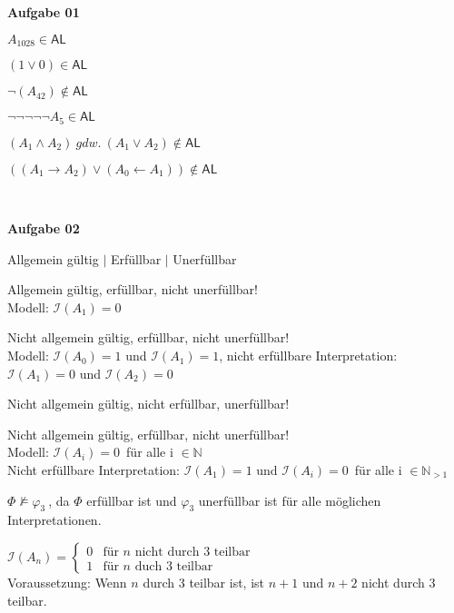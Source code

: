 \documentclass[a4paper,10pt]{article}
\begin{document}
	\parindent0pt
	\textbf{Aufgabe 01}
	\begin{compactenum}[(i)]
		\item $ A_{1028} \in \mathsf{AL} $
		\item $ (1 \vee 0) \in \mathsf{AL}$
		\item $ \lnot(A_{42})\notin \mathsf{AL}$
		\item $ \lnot\lnot\lnot\lnot\lnot A_5 \in \mathsf{AL}$
		\item $ (A_1 \wedge A_2)\ gdw.\ (A_1 \vee A_2)\notin \mathsf{AL}$
		\item $ ((A_1 \to A_2) \vee (A_0 \leftarrow A_1))\notin \mathsf{AL}$
	\end{compactenum}\

	\textbf{Aufgabe 02}
	\begin{compactenum}[(a)]
		\item Allgemein gültig $\mid$ Erfüllbar $\mid$ Unerfüllbar
		\begin{compactenum}[(i)]
			\item Allgemein gültig, erfüllbar, nicht unerfüllbar!\\
			Modell: $\mathcal{I}(A_1)=0 $
			\item Nicht allgemein gültig, erfüllbar, nicht unerfüllbar!\\
			Modell: $\mathcal{I}(A_0)=1 $ und $\mathcal{I}(A_1)=1 $, nicht erfüllbare Interpretation: $\mathcal{I}(A_1)=0 $ und	$\mathcal{I}(A_2)=0 $
			\item Nicht allgemein gültig, nicht erfüllbar, unerfüllbar!
			\item Nicht allgemein gültig, erfüllbar, nicht unerfüllbar!\\
			Modell: $\mathcal{I}(A_i)=0 $\ für alle i $\in \mathbb{N} $\\
			Nicht erfüllbare Interpretation: $\mathcal{I}(A_1)=1$ und $\mathcal{I}(A_i)=0 $\ für alle i $\in \mathbb{N}_{>1}$
		\end{compactenum}
		\item $\Phi \nvDash \varphi_3\ $, da $\Phi$ erfüllbar ist und $\varphi_3$ unerfüllbar ist für alle möglichen Interpretationen.
		\item $ \mathcal{I}(A_n)=
		\begin{cases}
		0 & \text{für $n$ nicht durch 3 teilbar}\\
		1 & \text{für $n$ duch 3 teilbar}
		\end{cases}
		$ \\ Voraussetzung: Wenn $n$ durch 3 teilbar ist, ist $n+1$ und $n+2$ nicht durch 3 teilbar.

\end{compactenum}
\end{document}
